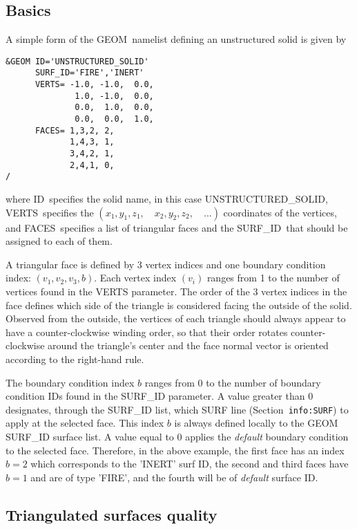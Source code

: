 \documentclass[12pt]{article}
\begin{document}
\subsection{Basics}
\label{info:GEOM_Basics}

A simple form of the {\ct GEOM}\ namelist defining an unstructured solid is given by

\begin{verbatim}
&GEOM ID='UNSTRUCTURED_SOLID'
      SURF_ID='FIRE','INERT'
      VERTS= -1.0, -1.0,  0.0, 
              1.0, -1.0,  0.0, 
              0.0,  1.0,  0.0, 
              0.0,  0.0,  1.0,
      FACES= 1,3,2, 2,  
             1,4,3, 1,  
             3,4,2, 1,  
             2,4,1, 0,  
/
\end{verbatim}

\noindent where {\ct ID}\ specifies the solid name, in this case {\ct UNSTRUCTURED\_SOLID},
{\ct VERTS}\ specifies the $(x_1,y_1,z_1, \quad x_2,y_2,z_2, \quad ...)$ coordinates of the vertices,
and {\ct FACES}\ specifies a list of triangular faces and the {\ct SURF\_ID}\ that should be
assigned to each of them.

A triangular face is defined by 3 vertex indices and one boundary condition index: $(v_1,v_2,v_3,b)$.
Each vertex index $(v_i)$ ranges from 1 to the number of vertices found in the {\ct VERTS} parameter.
The order of the 3 vertex indices in the face defines which side of the triangle is considered facing
the outside of the solid. Observed from the outside, the vertices of each triangle should always appear
to have a counter-clockwise winding order, so that their order rotates counter-clockwise around the
triangle's center and the face normal vector is oriented according to the right-hand rule.

The boundary condition index $b$ ranges from 0 to the number of boundary condition {\ct IDs} found in
the {\ct SURF\_ID} parameter. A value greater than 0 designates, through the {\ct SURF\_ID} list, which  
{\ct SURF} line (Section~\texttt{info:SURF}) to apply at the selected face. This index $b$ is always defined locally to the
{\ct GEOM SURF\_ID} surface list. A value equal to 0 applies the \textit{default} boundary condition to the selected face.
Therefore, in the above example, the first face has an index $b=2$ which corresponds to the {\ct 'INERT'} surf ID, the 
second and third faces have $b=1$ and are of type {\ct 'FIRE'}, and the fourth will be of \textit{default} surface ID.

\subsection{Triangulated surfaces quality}
\end{document}
